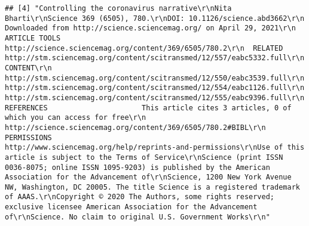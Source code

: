 \documentclass[
]{book}
\begin{document}
\begin{verbatim}
## [4] "Controlling the coronavirus narrative\r\nNita Bharti\r\nScience 369 (6505), 780.\r\nDOI: 10.1126/science.abd3662\r\n                                                                                                                        Downloaded from http://science.sciencemag.org/ on April 29, 2021\r\n  ARTICLE TOOLS                   http://science.sciencemag.org/content/369/6505/780.2\r\n  RELATED                         http://stm.sciencemag.org/content/scitransmed/12/557/eabc5332.full\r\n  CONTENT\r\n                                  http://stm.sciencemag.org/content/scitransmed/12/550/eabc3539.full\r\n                                  http://stm.sciencemag.org/content/scitransmed/12/554/eabc1126.full\r\n                                  http://stm.sciencemag.org/content/scitransmed/12/555/eabc9396.full\r\n  REFERENCES                      This article cites 3 articles, 0 of which you can access for free\r\n                                  http://science.sciencemag.org/content/369/6505/780.2#BIBL\r\n  PERMISSIONS                     http://www.sciencemag.org/help/reprints-and-permissions\r\nUse of this article is subject to the Terms of Service\r\nScience (print ISSN 0036-8075; online ISSN 1095-9203) is published by the American Association for the Advancement of\r\nScience, 1200 New York Avenue NW, Washington, DC 20005. The title Science is a registered trademark of AAAS.\r\nCopyright © 2020 The Authors, some rights reserved; exclusive licensee American Association for the Advancement of\r\nScience. No claim to original U.S. Government Works\r\n"                                                                                                                                                                                                                                                                                                                                                                                                                                                                                                                                                                                                                                                                                                                                                                                                                                                                                                                                                                                                                                                                                                                                                                                                                                                                                                                                                                                                                                                                                                                                                                                                                                                                                                                                                                                                    
\end{verbatim}
\end{document}
